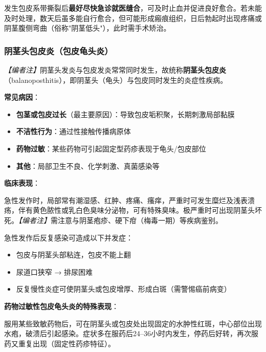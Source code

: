 \begin{tcolorbox}[colback=pink!5!white,colframe=red!50!black,title=贴心小叮咛]
发生包皮系带撕裂后\textbf{最好尽快急诊就医缝合}，可及时止血并促进良好愈合。若未能及时处理，数天后虽多能自行愈合，但可能形成瘢痕组织，日后勃起时出现疼痛或阴茎腹侧弯曲（俗称"阴茎低头"），此时需手术矫治。
\end{tcolorbox}

\subsubsection{阴茎头包皮炎（包皮龟头炎）}

\noindent\textit{【编者注】}阴茎头发炎与包皮发炎常常同时发生，故统称\textbf{阴茎头包皮炎}（balanoposthitis），即阴茎头（龟头）与包皮同时发生的炎症性疾病。

\vspace{0.5em}
\noindent\textbf{常见病因}：

\begin{itemize}
	\item \textbf{包茎或包皮过长}（最主要原因）：导致包皮垢积聚，长期刺激局部黏膜
	\item \textbf{不洁性行为}：通过性接触传播病原体
	\item \textbf{药物过敏}：某些药物可引起固定型药疹表现于龟头/包皮部位
	\item \textbf{其他}：局部卫生不良、化学刺激、真菌感染等
\end{itemize}

\vspace{0.5em}
\noindent\textbf{临床表现}：

急性发作时，局部常有潮湿感、红肿、疼痛、瘙痒，严重时可发生糜烂及浅表溃疡，伴有黄色脓性或乳白色臭味分泌物，可有特殊臭味。极严重时可出现阴茎头坏死。\textit{【编者注】}需注意与阴茎疱疹、硬下疳（梅毒一期）等疾病鉴别。

急性发作后反复感染可造成以下并发症：
\begin{itemize}
	\item 包皮与阴茎头部粘连，包皮不能上翻
	\item 尿道口狭窄 → 排尿困难
	\item 反复慢性炎症可使阴茎头或包皮增厚、形成白斑（需警惕癌前病变）
\end{itemize}

\vspace{0.5em}
\noindent\textbf{药物过敏性包皮龟头炎的特殊表现}：

服用某些致敏药物后，可在阴茎头或包皮处出现固定的水肿性红斑，中心部位出现水疱，破溃后引起感染。症状多在服药后24--36小时内发生，停药后好转，再次服药又重复出现（固定性药疹特征）。

